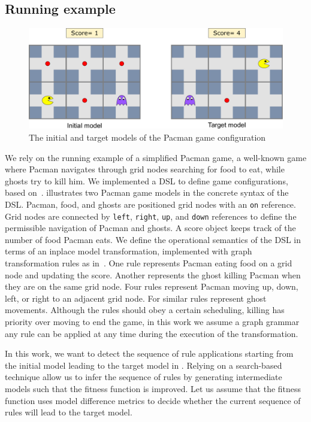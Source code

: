 \subsection{Running example}

\begin{figure}
    \centering
    \includegraphics[width=\linewidth]{images/pacman_example}
    \caption{The initial and target models of the Pacman game configuration}
    \label{fig:example}
\end{figure}
%
We rely on the running example of a simplified Pacman game, a well-known game where Pacman navigates through grid nodes searching for food to eat, while ghosts try to kill him.
We implemented a DSL to define game configurations, based on~\cite{Syriani2013a}.
 illustrates two Pacman game models in the concrete syntax of the DSL.
Pacman, food, and ghosts are positioned grid nodes with an \texttt{on} reference.
Grid nodes are connected by \texttt{left}, \texttt{right}, \texttt{up}, and \texttt{down} references to define the permissible navigation of Pacman and ghosts.
A score object keeps track of the number of food Pacman eats.
We define the operational semantics of the DSL in terms of an inplace model transformation, implemented with graph transformation rules as in~\cite{Syriani2013a}.
One rule represents Pacman eating food on a grid node and updating the score.
Another represents the ghost killing Pacman when they are on the same grid node.
Four rules represent Pacman moving up, down, left, or right to an adjacent grid node.
For similar rules represent ghost movements.
Although the rules should obey a certain scheduling, \eg killing has priority over moving to end the game, in this work we assume a graph grammar \ie any rule can be applied at any time during the execution of the transformation.

In this work, we want to detect the sequence of rule applications starting from the initial model leading to the target model in .
Relying on a search-based technique allow us to infer the sequence of rules by generating intermediate models such that the fitness function is improved.
Let us assume that the fitness function uses model difference metrics to decide whether the current sequence of rules will lead to the target model.


